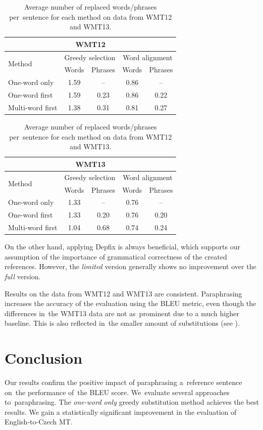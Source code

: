 \begin{table}[htb]
\begin{center}
\begin{tabular}{l|cc|cc}
\multicolumn{5}{c}{\textbf{WMT12}}\\
\hline
\multirow{2}{*}{Method} & \multicolumn{2}{c|}{Greedy selection} & \multicolumn{2}{c}{Word alignment} \\
& Words & Phrases & Words & Phrases \\
\hline
One-word only     & 1.59 & --   & 0.86 &  --  \\
One-word first    & 1.59 & 0.23 & 0.86 & 0.22 \\
Multi-word first  & 1.38 & 0.31 & 0.81 & 0.27 \\
\end{tabular}
\vspace{10pt}
\begin{tabular}{l|cc|cc}
\multicolumn{5}{c}{\textbf{WMT13}}\\
\hline
\multirow{2}{*}{Method} & \multicolumn{2}{c|}{Greedy selection} & \multicolumn{2}{c}{Word alignment} \\
& Words & Phrases & Words & Phrases \\
\hline
One-word only    & 1.33 &  --  & 0.76 & --   \\
One-word first   & 1.33 & 0.20 & 0.76 & 0.20 \\
Multi-word first & 1.04 & 0.68 & 0.74 & 0.24 \\
\end{tabular}

\caption{Average number of replaced words/phrases per~sentence for each method 
on data from WMT12 and WMT13.}
\label{substitutions:12:13}
\end{center}
\end{table}

On the other hand, applying Depfix is always beneficial, which supports our
 assumption of the importance of grammatical correctness of the created
references. However, the \textit{limited} version generally shows no 
improvement over the \textit{full} version.

Results on the data from WMT12 and WMT13 are consistent. Paraphrasing increases 
the accuracy of the evaluation using the BLEU metric, even though the 
differences in~the WMT13 data are not as~prominent due to a much higher 
baseline. This is also reflected in~the smaller amount of substitutions (see 
).

\section{Conclusion}
Our results confirm the positive impact of paraphrasing a~reference sentence 
on~the performance of~the BLEU score. We~evaluate several approaches 
to~paraphrasing. The \textit{one-word only} greedy substitution method achieves 
the best results. We gain a statistically significant improvement in the 
evaluation of English-to-Czech MT. 

